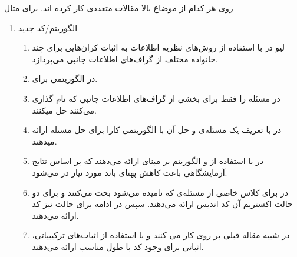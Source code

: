 روی هر کدام از موضاع بالا مقالات متعددی کار کرده اند. برای مثال
\begin{enumerate}
	\item الگوریتم‌/کد جدید
	\begin{enumerate}
		\item 
		لیو در
		\cite{8278015}
		با استفاده از روش‌های نظریه اطلاعات به اثبات کران‌هایی برای چند خانواده مختلف از گراف‌های اطلاعات جانبی می‌پردازد.
		\item 
	در
	\cite{10313405}
	الگوریتمی برای.
	\item
	در
	\cite{8871209}
	مسئله را فقط برای بخشی از گراف‌های اطلاعات جانبی که
	نام گذاری می‌کنند حل میکنند.
	\item
	در
	\cite{9759449}
	با تعریف یک مسئله‌ی
	و حل آن با 
	الگوریتمی کارا برای حل مسئله ارائه میدهند.
	\item
	در
	\cite{8682270}
	با استفاده از
	\picod
	و الگوریتم بر مبنای
	 ارائه می‌دهند که بر اساس نتایج آزمایشگاهی باعث کاهش پهنای باند مورد نیاز در
	 می‌شود.
	 \item
	 در
	 \cite{sasi2019pliable}
	 برای کلاس خاصی از مسئله‌ی
	 \picod
	 که
	 نامیده می‌شود بحث می‌کنند و برای دو حالت اکستریم آن کد اندیس ارائه می‌دهند. سپس در ادامه برای حالت
	 نیز کد ارائه می‌دهند.
	 \item 
	 در
	 \cite{8613483}
	 شبیه مقاله قبلی بر روی
	 کار می کنند و با استفاده از اثبات‌های ترکیبیاتی، اثباتی برای وجود کد با طول مناسب ارائه می‌دهند.
	\end{enumerate}
	 

\end{enumerate}

